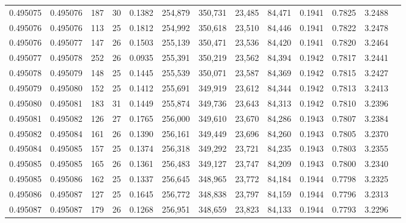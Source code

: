 \begin{tabular}{rrrrrrrrrrrrr}
0.495075 & 0.495076 & 187 &  30 &                                     0.1382 & 254,879 & 350,731 &  23,485 &  84,471 & 0.1941 & 0.7825 & 3.2488 \\
0.495076 & 0.495076 & 113 &  25 &                                     0.1812 & 254,992 & 350,618 &  23,510 &  84,446 & 0.1941 & 0.7822 & 3.2478 \\
0.495076 & 0.495077 & 147 &  26 &                                     0.1503 & 255,139 & 350,471 &  23,536 &  84,420 & 0.1941 & 0.7820 & 3.2464 \\
0.495077 & 0.495078 & 252 &  26 &                                     0.0935 & 255,391 & 350,219 &  23,562 &  84,394 & 0.1942 & 0.7817 & 3.2441 \\
0.495078 & 0.495079 & 148 &  25 &                                     0.1445 & 255,539 & 350,071 &  23,587 &  84,369 & 0.1942 & 0.7815 & 3.2427 \\
0.495079 & 0.495080 & 152 &  25 &                                     0.1412 & 255,691 & 349,919 &  23,612 &  84,344 & 0.1942 & 0.7813 & 3.2413 \\
0.495080 & 0.495081 & 183 &  31 &                                     0.1449 & 255,874 & 349,736 &  23,643 &  84,313 & 0.1942 & 0.7810 & 3.2396 \\
0.495081 & 0.495082 & 126 &  27 &                                     0.1765 & 256,000 & 349,610 &  23,670 &  84,286 & 0.1943 & 0.7807 & 3.2384 \\
0.495082 & 0.495084 & 161 &  26 &                                     0.1390 & 256,161 & 349,449 &  23,696 &  84,260 & 0.1943 & 0.7805 & 3.2370 \\
0.495084 & 0.495085 & 157 &  25 &                                     0.1374 & 256,318 & 349,292 &  23,721 &  84,235 & 0.1943 & 0.7803 & 3.2355 \\
0.495085 & 0.495085 & 165 &  26 &                                     0.1361 & 256,483 & 349,127 &  23,747 &  84,209 & 0.1943 & 0.7800 & 3.2340 \\
0.495085 & 0.495086 & 162 &  25 &                                     0.1337 & 256,645 & 348,965 &  23,772 &  84,184 & 0.1944 & 0.7798 & 3.2325 \\
0.495086 & 0.495087 & 127 &  25 &                                     0.1645 & 256,772 & 348,838 &  23,797 &  84,159 & 0.1944 & 0.7796 & 3.2313 \\
0.495087 & 0.495087 & 179 &  26 &                                     0.1268 & 256,951 & 348,659 &  23,823 &  84,133 & 0.1944 & 0.7793 & 3.2296 \\

\end{tabular}
